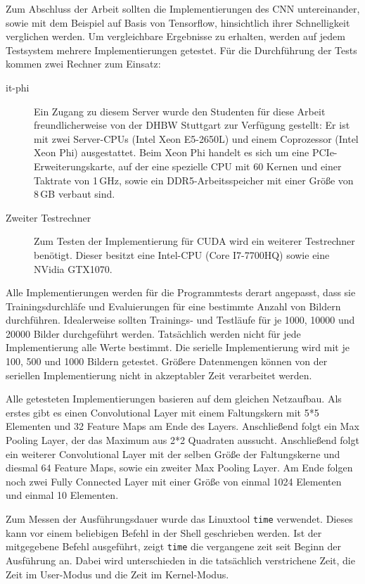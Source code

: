 \documentclass[../main.tex]{subfiles}
\begin{document}
Zum Abschluss der Arbeit sollten die Implementierungen des CNN untereinander, sowie mit dem Beispiel auf Basis von Tensorflow, hinsichtlich ihrer Schnelligkeit verglichen werden. Um vergleichbare Ergebnisse zu erhalten, werden auf jedem Testsystem mehrere Implementierungen getestet. Für die Durchführung der Tests kommen zwei Rechner zum Einsatz: 
\begin{description}
\item[it-phi] Ein Zugang zu diesem Server wurde den Studenten für diese Arbeit freundlicherweise von der DHBW Stuttgart zur Verfügung gestellt: Er ist mit zwei Server-CPUs (Intel Xeon E5-2650L) und einem Coprozessor (Intel Xeon Phi) ausgestattet. Beim Xeon Phi handelt es sich um eine PCIe-Erweiterungskarte, auf der eine spezielle CPU mit 60 Kernen und einer Taktrate von 1\,GHz, sowie ein DDR5-Arbeitsspeicher mit einer Größe von 8\,GB verbaut sind. 
\item[Zweiter Testrechner] Zum Testen der Implementierung für CUDA wird ein weiterer Testrechner benötigt. Dieser besitzt eine Intel-CPU (Core I7-7700HQ) sowie eine NVidia GTX1070. 
\end{description}
Alle Implementierungen werden für die Programmtests derart angepasst, dass sie Trainingsdurchläfe und Evaluierungen für eine bestimmte Anzahl von Bildern durchführen. Idealerweise sollten Trainings- und Testläufe für je 1000, 10000 und 20000 Bilder durchgeführt werden. Tatsächlich werden nicht für jede Implementierung alle Werte bestimmt. Die serielle Implementierung wird mit je 100, 500 und 1000 Bildern getestet. Größere Datenmengen können von der seriellen Implementierung nicht in akzeptabler Zeit verarbeitet werden. 

Alle getesteten Implementierungen basieren auf dem gleichen Netzaufbau. Als erstes gibt es einen Convolutional Layer mit einem Faltungskern mit 5*5 Elementen und 32 Feature Maps am Ende des Layers. Anschließend folgt ein Max Pooling Layer, der das Maximum aus 2*2 Quadraten aussucht. Anschließend folgt ein weiterer Convolutional Layer mit der selben Größe der Faltungskerne und diesmal 64 Feature Maps, sowie ein zweiter Max Pooling Layer. Am Ende folgen noch zwei Fully Connected Layer mit einer Größe von einmal 1024 Elementen und einmal 10 Elementen.

Zum Messen der Ausführungsdauer wurde das Linuxtool \texttt{time} verwendet. Dieses kann vor einem beliebigen Befehl in der Shell geschrieben werden. Ist der mitgegebene Befehl ausgeführt, zeigt \texttt{time} die vergangene zeit seit Beginn der Ausführung an. Dabei wird unterschieden in die tatsächlich verstrichene Zeit, die Zeit im User-Modus und die Zeit im Kernel-Modus.
\end{document}
